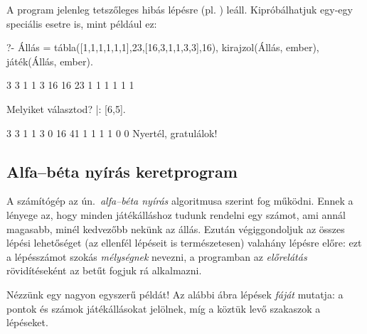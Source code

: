 A program jelenleg tetszőleges hibás lépésre
(pl. ) leáll. Kipróbálhatjuk egy-egy
speciális esetre is, mint például ez:
\begin{query}
?- Állás = tábla([1,1,1,1,1,1],23,[16,3,1,1,3,3],16),
   kirajzol(Állás, ember), játék(Állás, ember).

     3    3    1    1    3    16
16                                  23
     1    1    1    1    1    1

Melyiket választod?
|: [6,5].

     3    3    1    1    3    0
16                                  41
     1    1    1    1    0    0
Nyertél, gratulálok!
\end{query}

\subsection*{Alfa--béta nyírás keretprogram}
A számítógép az ún.~\emph{alfa--béta nyírás}
algoritmusa szerint fog működni. Ennek a lényege az,
hogy minden játékálláshoz tudunk rendelni egy
számot, ami annál magasabb, minél kedvezőbb
nekünk az állás. Ezután végiggondoljuk az összes lépési
lehetőséget (az ellenfél lépéseit is természetesen)
valahány lépésre előre: ezt a lépésszámot szokás
\emph{mélységnek} nevezni, a programban az
\emph{előrelátás} rövidítéseként az  betűt
fogjuk rá alkalmazni.

Nézzünk egy nagyon egyszerű példát! Az alábbi ábra
lépések \emph{fáját} mutatja: a pontok és számok
játékállásokat jelölnek, míg a köztük levő szakaszok
a lépéseket.

\begin{center}
\end{center}

